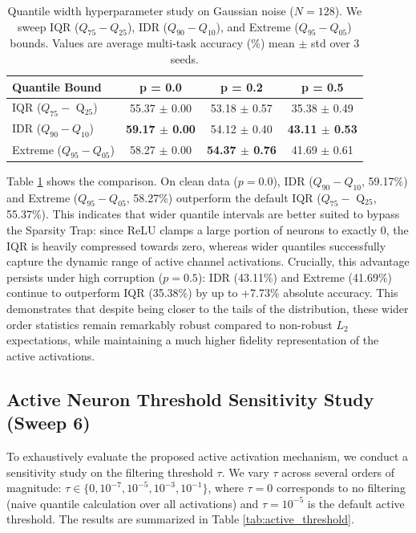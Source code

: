 \documentclass{article}
\theoremstyle{plain}
\theoremstyle{definition}
\theoremstyle{remark}
\begin{document}
\begin{table}[t]
  \caption{Quantile width hyperparameter study on Gaussian noise ($N=128$). We sweep IQR ($Q_{75}-Q_{25}$), IDR ($Q_{90}-Q_{10}$), and Extreme ($Q_{95}-Q_{05}$) bounds. Values are average multi-task accuracy (\%) mean $\pm$ std over 3 seeds.}
  \label{tab:quantile_width}
  \vskip 0.1in
  \begin{center}
    \begin{small}
      \begin{tabular}{lccc}
        \toprule
        \textbf{Quantile Bound} & \textbf{p = 0.0} & \textbf{p = 0.2} & \textbf{p = 0.5} \\
        \midrule
        IQR ($Q_{75} - $ Q$_{25}$) & 55.37 $\pm$ 0.00 & 53.18 $\pm$ 0.57 & 35.38 $\pm$ 0.49 \\
        IDR ($Q_{90} - Q_{10}$) & \textbf{59.17 $\pm$ 0.00} & 54.12 $\pm$ 0.40 & \textbf{43.11 $\pm$ 0.53} \\
        Extreme ($Q_{95} - Q_{05}$) & 58.27 $\pm$ 0.00 & \textbf{54.37 $\pm$ 0.76} & 41.69 $\pm$ 0.61 \\
        \bottomrule
      \end{tabular}
    \end{small}
  \end{center}
  \vskip -0.1in
\end{table}

Table \ref{tab:quantile_width} shows the comparison. On clean data ($p=0.0$), IDR ($Q_{90} - Q_{10}$, 59.17\%) and Extreme ($Q_{95} - Q_{05}$, 58.27\%) outperform the default IQR ($Q_{75} - $ Q$_{25}$, 55.37\%). This indicates that wider quantile intervals are better suited to bypass the Sparsity Trap: since ReLU clamps a large portion of neurons to exactly 0, the IQR is heavily compressed towards zero, whereas wider quantiles successfully capture the dynamic range of active channel activations.
Crucially, this advantage persists under high corruption ($p=0.5$): IDR (43.11\%) and Extreme (41.69\%) continue to outperform IQR (35.38\%) by up to +7.73\% absolute accuracy. This demonstrates that despite being closer to the tails of the distribution, these wider order statistics remain remarkably robust compared to non-robust $L_2$ expectations, while maintaining a much higher fidelity representation of the active activations.

\subsection{Active Neuron Threshold Sensitivity Study (Sweep 6)}
To exhaustively evaluate the proposed active activation mechanism, we conduct a sensitivity study on the filtering threshold $\tau$. We vary $\tau$ across several orders of magnitude: $\tau \in \{0, 10^{-7}, 10^{-5}, 10^{-3}, 10^{-1}\}$, where $\tau = 0$ corresponds to no filtering (naive quantile calculation over all activations) and $\tau = 10^{-5}$ is the default active threshold. The results are summarized in Table \ref{tab:active_threshold}.
\end{document}
